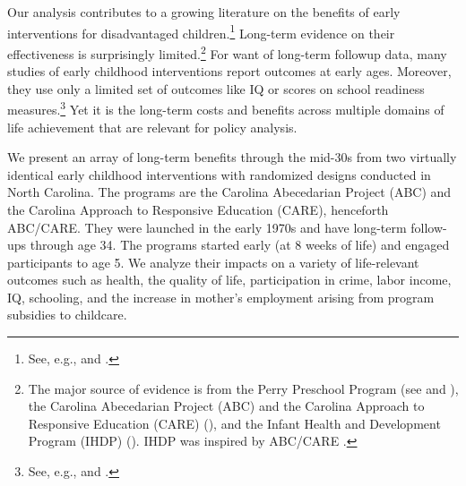 Our analysis contributes to a growing literature on the benefits of early interventions for disadvantaged children.\footnote{See, e.g., \cite{Currie_2011_AER} and \cite{Elango_Hojman_etal_2016_Early-Edu}.} Long-term evidence on their effectiveness is surprisingly limited.\footnote{The major source of evidence is from the Perry Preschool Program (see \citealp{Schweinhart_Montie_ea_2005_BOOKlifetime} and \citealp{Heckman_Moon_etal_2010_RateofReturn,Heckman_Moon_etal_2010_QE}), the Carolina Abecedarian Project (ABC) and the Carolina Approach to Responsive Education (CARE) (\citealp{Ramey_Campbell_etal_2000_ADS,Ramey-etal_2012-ABC}), and the Infant Health and Development Program (IHDP) (\citealp{Gross_Spiker_etal_1997_BOOKHelpinglowbirth,Duncan_Sojourner_2013_JHR}). IHDP was inspired by ABC/CARE \citep[][]{Gross_Spiker_etal_1997_BOOKHelpinglowbirth}.} For want of long-term followup data, many studies of early childhood interventions report outcomes at early ages. Moreover, they use only a limited set of outcomes like IQ or scores on school readiness measures.\footnote{See, e.g., \cite{Kline_Walters_2016_QJE} and \cite{Weiland_2013_CD_Impacts-of-Pre-K}.} Yet it is the long-term costs and benefits across multiple domains of life achievement that are relevant for policy analysis.

We present an array of long-term benefits through the mid-30s from two virtually identical early childhood interventions with randomized designs conducted in North Carolina. The programs are the Carolina Abecedarian Project (ABC) and the Carolina Approach to Responsive Education (CARE), henceforth ABC/CARE. They were launched in the early 1970s and have long-term follow-ups through age 34. The programs started early (at 8 weeks of life) and engaged participants to age 5. We analyze their impacts on a variety of life-relevant outcomes such as health, the quality of life, participation in crime, labor income, IQ, schooling, and the increase in mother's employment arising from program subsidies to childcare.

